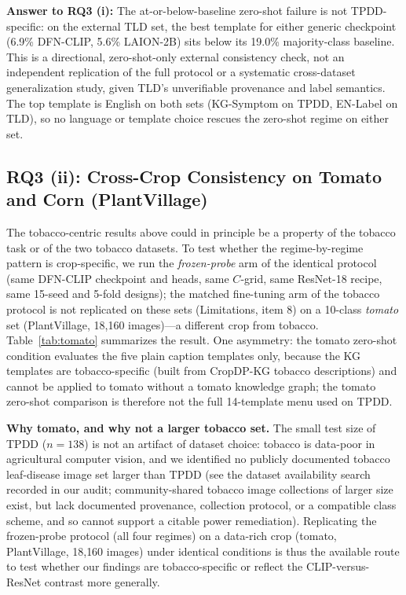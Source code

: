 \documentclass[10pt,a4paper]{article}
\begin{document}
\textbf{Answer to RQ3 (i):} The at-or-below-baseline zero-shot failure is not TPDD-specific: on the external TLD set, the best template for either generic checkpoint (6.9\% DFN-CLIP, 5.6\% LAION-2B) sits below its 19.0\% majority-class baseline. This is a directional, zero-shot-only external consistency check, not an independent replication of the full protocol or a systematic cross-dataset generalization study, given TLD's unverifiable provenance and label semantics. The top template is English on both sets (KG-Symptom on TPDD, EN-Label on TLD), so no language or template choice rescues the zero-shot regime on either set.

\subsection{RQ3 (ii): Cross-Crop Consistency on Tomato and Corn (PlantVillage)}

The tobacco-centric results above could in principle be a property of the tobacco task or of the two tobacco datasets. To test whether the regime-by-regime pattern is crop-specific, we run the \emph{frozen-probe} arm of the identical protocol (same DFN-CLIP checkpoint and heads, same $C$-grid, same ResNet-18 recipe, same 15-seed and 5-fold designs); the matched fine-tuning arm of the tobacco protocol is not replicated on these sets (Limitations, item 8) on a 10-class \emph{tomato} set (PlantVillage, 18{,}160 images)---a different crop from tobacco. Table~\ref{tab:tomato} summarizes the result.
One asymmetry: the tomato zero-shot condition evaluates the five plain caption templates only, because the KG templates are tobacco-specific (built from CropDP-KG tobacco descriptions) and cannot be applied to tomato without a tomato knowledge graph; the tomato zero-shot comparison is therefore not the full 14-template menu used on TPDD.

\textbf{Why tomato, and why not a larger tobacco set.} The small test size of TPDD ($n{=}138$) is not an artifact of dataset choice: tobacco is data-poor in agricultural computer vision, and we identified no publicly documented tobacco leaf-disease image set larger than TPDD (see the dataset availability search recorded in our audit; community-shared tobacco image collections of larger size exist, but lack documented provenance, collection protocol, or a compatible class scheme, and so cannot support a citable power remediation). Replicating the frozen-probe protocol (all four regimes) on a data-rich crop (tomato, PlantVillage, 18{,}160 images) under identical conditions is thus the available route to test whether our findings are tobacco-specific or reflect the CLIP-versus-ResNet contrast more generally.
\end{document}
